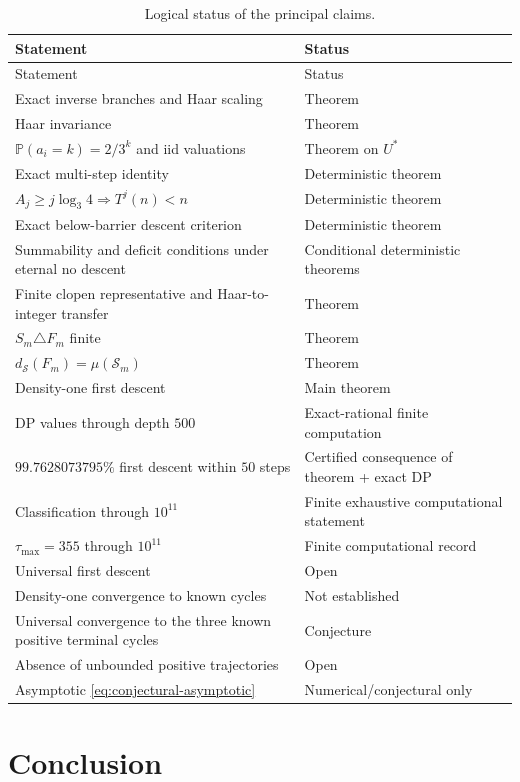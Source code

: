 \documentclass[11pt]{article}
\theoremstyle{definition}
\theoremstyle{remark}
\newcommand{\Sset}{\mathcal S}
\newcommand{\Ustar}{U^\ast}
\newcommand{\Prob}{\mathbb P}
\newcommand{\ds}{d_{\Sset}}
\begin{document}
\begin{longtable}{p{}p{}}
\caption{Logical status of the principal claims.}
\label{tab:claims}\\
\toprule
Statement & Status\\
\midrule
\endfirsthead
\toprule
Statement & Status\\
\midrule
\endhead
Exact inverse branches and Haar scaling & Theorem\\
Haar invariance & Theorem\\
$\Prob(a_i=k)=2/3^k$ and iid valuations & Theorem on $\Ustar$\\
Exact multi-step identity & Deterministic theorem\\
$A_j\ge j\log_3 4\Rightarrow T^j(n)<n$ & Deterministic theorem\\
Exact below-barrier descent criterion & Deterministic theorem\\
Summability and deficit conditions under eternal no descent & Conditional deterministic theorems\\
Finite clopen representative and Haar-to-integer transfer & Theorem\\
$S_m\triangle F_m$ finite & Theorem\\
$\ds(F_m)=\mu(\mathcal S_m)$ & Theorem\\
Density-one first descent & Main theorem\\
DP values through depth $500$ & Exact-rational finite computation\\
$99.7628073795\%$ first descent within $50$ steps & Certified consequence of theorem + exact DP\\
Classification through $10^{11}$ & Finite exhaustive computational statement\\
$\tau_{\max}=355$ through $10^{11}$ & Finite computational record\\
Universal first descent & Open\\
Density-one convergence to known cycles & Not established\\
Universal convergence to the three known positive terminal cycles & Conjecture\\
Absence of unbounded positive trajectories & Open\\
Asymptotic \eqref{eq:conjectural-asymptotic} & Numerical/conjectural only\\
\bottomrule
\end{longtable}

\section{Conclusion}
\end{document}
